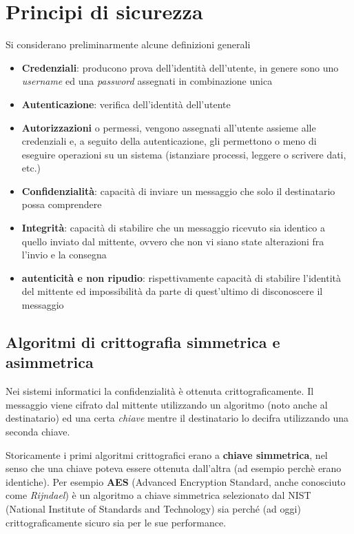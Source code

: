 \documentclass[italian,]{article}
\providecommand{\tightlist}{%
  \setlength{\itemsep}{0pt}\setlength{\parskip}{0pt}}
\begin{document}
\section{Principi di sicurezza}\label{principi-di-sicurezza}

Si considerano preliminarmente alcune definizioni generali

\begin{itemize}
\tightlist
\item
  \textbf{Credenziali}: producono prova dell'identità dell'utente, in
  genere sono uno \emph{username} ed una \emph{password} assegnati in
  combinazione unica
\item
  \textbf{Autenticazione}: verifica dell'identità dell'utente
\item
  \textbf{Autorizzazioni} o permessi, vengono assegnati all'utente
  assieme alle credenziali e, a seguito della autenticazione, gli
  permettono o meno di eseguire operazioni su un sistema (istanziare
  processi, leggere o scrivere dati, etc.)
\item
  \textbf{Confidenzialità}: capacità di inviare un messaggio che solo il
  destinatario possa comprendere
\item
  \textbf{Integrità}: capacità di stabilire che un messaggio ricevuto
  sia identico a quello inviato dal mittente, ovvero che non vi siano
  state alterazioni fra l'invio e la consegna
\item
  \textbf{autenticità e non ripudio}: rispettivamente capacità di
  stabilire l'identità del mittente ed impossibilità da parte di
  quest'ultimo di disconoscere il messaggio
\end{itemize}

\subsection{Algoritmi di crittografia simmetrica e
asimmetrica}\label{algoritmi-di-crittografia-simmetrica-e-asimmetrica}

Nei sistemi informatici la confidenzialità è ottenuta
crittograficamente. Il messaggio viene cifrato dal mittente utilizzando
un algoritmo (noto anche al destinatario) ed una certa \emph{chiave}
mentre il destinatario lo decifra utilizzando una seconda chiave.

Storicamente i primi algoritmi crittografici erano a \textbf{chiave
simmetrica}, nel senso che una chiave poteva essere ottenuta dall'altra
(ad esempio perchè erano identiche). Per esempio \textbf{AES} (Advanced
Encryption Standard, anche conosciuto come \emph{Rijndael}) è un
algoritmo a chiave simmetrica selezionato dal NIST (National Institute
of Standards and Technology) sia perché (ad oggi) crittograficamente
sicuro sia per le sue performance.
\end{document}
